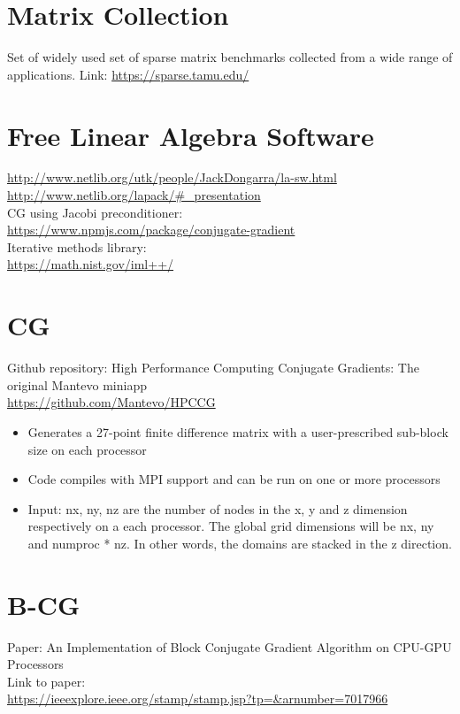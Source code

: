 \documentclass[]{scrartcl}
\begin{document}
\section{Matrix Collection}
Set of widely used set of sparse matrix benchmarks collected from a wide range of applications.
Link:
\url{https://sparse.tamu.edu/} \\

\section{Free Linear Algebra Software}
\url{http://www.netlib.org/utk/people/JackDongarra/la-sw.html} \\
\url{http://www.netlib.org/lapack/\#_presentation} \\

CG using Jacobi preconditioner:\\
\url{https://www.npmjs.com/package/conjugate-gradient} \\

Iterative methods library:\\
\url{https://math.nist.gov/iml++/ } \\
\section{CG}
Github repository: High Performance Computing Conjugate Gradients: The original Mantevo miniapp \\
\url{https://github.com/Mantevo/HPCCG} 
\begin{itemize}
	\item Generates a 27-point finite difference matrix with a user-prescribed sub-block size on each processor
	\item Code compiles with MPI support and can be run on one or more processors
	\item Input: nx, ny, nz are the number of nodes in the x, y and z dimension respectively on a each processor. The global grid dimensions will be nx, ny and numproc * nz. In other words, the domains are stacked in the z direction.
\end{itemize}
\section{B-CG}
Paper: An Implementation of Block Conjugate Gradient Algorithm on CPU-GPU Processors \\
Link to paper: \\ 
\url{https://ieeexplore.ieee.org/stamp/stamp.jsp?tp=&arnumber=7017966}
\end{document}
